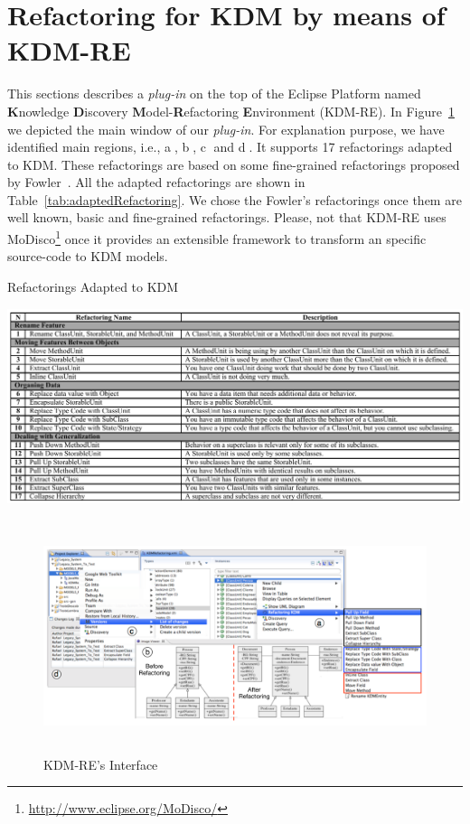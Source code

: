 \documentclass[12pt]{article}
\let\cite=\citep
\begin{document}

\section{Refactoring for KDM by means of KDM-RE}\label{sec:refactoring_kdm_kdm_re}

This sections describes a \textit{plug-in} on the top of the Eclipse Platform named \textbf{K}nowledge \textbf{D}iscovery \textbf{M}odel-\textbf{R}efactoring \textbf{E}nvironment (KDM-RE). 
In Figure~\ref{fig:interface} we depicted the main window of our \textit{plug-in}. 
For explanation purpose, we have identified main regions, i.e., \textcircled{a}, \textcircled{b}, \textcircled{c} and \textcircled{d}.
It supports 17 refactorings adapted to KDM. These refactorings are based on some fine-grained refactorings proposed by Fowler~\cite{refactImpro}. All the adapted refactorings are shown in Table~\ref{tab:adaptedRefactoring}. We chose the Fowler's refactorings once them are well known, basic and fine-grained refactorings. Please, not that KDM-RE uses MoDisco\footnote{\url{http://www.eclipse.org/MoDisco/}} once it provides an extensible framework to transform an specific source-code to KDM models.


\begin{table}[!h]
\caption{Refactorings Adapted to KDM}
\label{tab:adaptedRefactoring}
\centering
  \includegraphics[scale=0.67]{Figure/Catalogue}
\end{table}

\begin{figure}[!ht]
\centering
  \includegraphics[width=15cm, height=6.8cm]{figure/ScreenShot_with_UML}
\caption{KDM-RE's Interface}
\label{fig:interface}
\end{figure}
 
\end{document}

